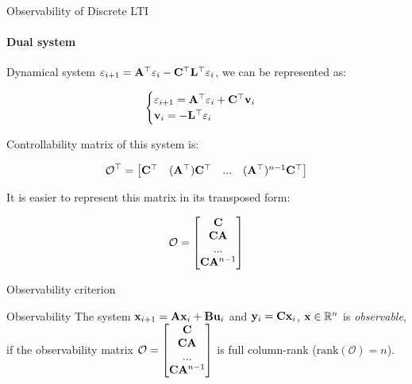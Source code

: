 \documentclass{beamer}
\begin{document}
\begin{frame}{Observability of Discrete LTI}
\framesubtitle{Dual system}
\begin{flushleft}

Dynamical system $\varepsilon_{i+1} = \mathbf{A}^\top \varepsilon_i - \mathbf{C}^\top \mathbf{L}^\top \varepsilon_i$, we can be represented as:

\begin{equation}
\begin{cases}
\varepsilon_{i+1} = \mathbf{A}^\top \varepsilon_i + \mathbf{C}^\top \mathbf{v}_i \\
\mathbf{v}_i = - \mathbf{L}^\top \varepsilon_i
\end{cases}
\end{equation}

Controllability matrix of this system is:

\begin{equation}
\mathcal{O}^\top = \begin{bmatrix}
    \mathbf{C}^\top &
    (\mathbf{A}^\top) \mathbf{C}^\top & ... &
    (\mathbf{A}^\top)^{n - 1} \mathbf{C}^\top
    \end{bmatrix}
\end{equation}

It is easier to represent this matrix in its transposed form:

\begin{equation}
\mathcal{O} = \begin{bmatrix}
    \mathbf{C} \\
    \mathbf{C}\mathbf{A}  \\ ... \\
    \mathbf{C}\mathbf{A}^{n - 1}
    \end{bmatrix}
\end{equation}

\end{flushleft}
\end{frame}


\begin{frame}{Observability criterion}
\begin{flushleft}

\begin{block}{Observability}
The system $\mathbf{x}_{i+1} = \mathbf{A}  \mathbf{x}_i + \mathbf{B} \mathbf{u}_i$ and $\mathbf{y}_i = \mathbf{C}  \mathbf{x}_i$, $\mathbf{x} \in \mathbb{R}^n$ is \emph{observable}, if the observability matrix $\mathcal{O} = \begin{bmatrix}
    \mathbf{C} \\
    \mathbf{C}\mathbf{A}  \\ ... \\
    \mathbf{C}\mathbf{A}^{n - 1}
    \end{bmatrix}$ is full column-rank ($\text{rank}(\mathcal{O}) = n$).
\end{block}

\end{flushleft}
\end{frame}
\end{document}
